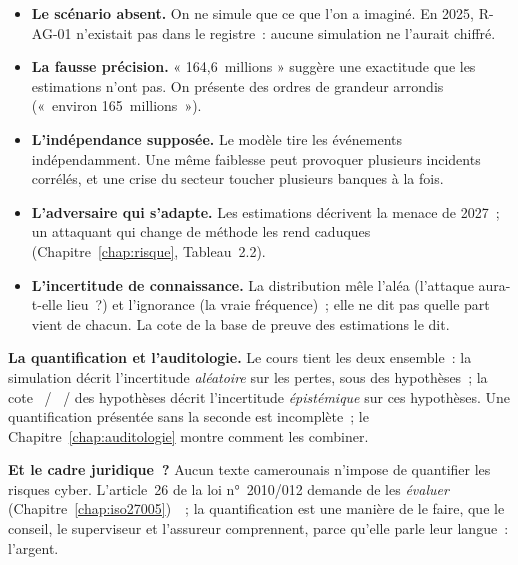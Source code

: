 \begin{itemize}
    \item \textbf{Le scénario absent.} On ne simule que ce que l'on a
          imaginé. En 2025, R-AG-01 n'existait pas dans le registre~:
          aucune simulation ne l'aurait chiffré.
    \item \textbf{La fausse précision.} « 164,6~millions » suggère une
          exactitude que les estimations n'ont pas. On présente des ordres
          de grandeur arrondis («~environ 165~millions~»).
    \item \textbf{L'indépendance supposée.} Le modèle tire les événements
          indépendamment. Une même faiblesse peut provoquer plusieurs
          incidents corrélés, et une crise du secteur toucher plusieurs
          banques à la fois.
    \item \textbf{L'adversaire qui s'adapte.} Les estimations décrivent la
          menace de 2027~; un attaquant qui change de méthode les rend
          caduques (Chapitre~\ref{chap:risque}, Tableau~2.2).
    \item \textbf{L'incertitude de connaissance.} La distribution mêle
          l'aléa (l'attaque aura-t-elle lieu~?) et l'ignorance (la vraie
          fréquence)~; elle ne dit pas quelle part vient de chacun. La cote
          de la base de preuve des estimations le dit.
\end{itemize}

\begin{boxinfo}
\textbf{La quantification et l'auditologie.} Le cours tient les deux
ensemble~: la simulation décrit l'incertitude \emph{aléatoire} sur les
pertes, sous des hypothèses~; la cote \OUI{}~/ \NON{}~/ \NEK{} des
hypothèses décrit l'incertitude \emph{épistémique} sur ces hypothèses. Une
quantification présentée sans la seconde est incomplète~; le
Chapitre~\ref{chap:auditologie} montre comment les combiner.
\end{boxinfo}

\begin{boxinfo}
\textbf{Et le cadre juridique~?} Aucun texte camerounais n'impose de
quantifier les risques cyber. L'article~26 de la loi n°~2010/012 demande
de les \emph{évaluer} (Chapitre~\ref{chap:iso27005})~\cite{loi2010012}~;
la quantification est une manière de le faire, que le conseil, le
superviseur et l'assureur comprennent, parce qu'elle parle leur langue~:
l'argent.
\end{boxinfo}

